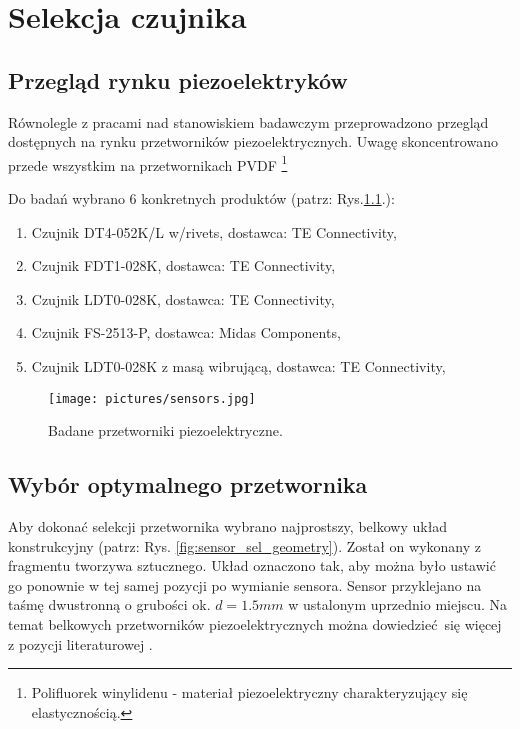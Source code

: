 \chapter{Selekcja czujnika}
\label{sec:sensor_selection}

\section{Przegląd rynku piezoelektryków}
\label{sec:piezoelectric_research}

Równolegle z pracami nad stanowiskiem badawczym przeprowadzono przegląd dostępnych
na rynku przetworników piezoelektrycznych. Uwagę skoncentrowano przede wszystkim 
na przetwornikach PVDF
\footnote{Polifluorek winylidenu - 
materiał piezoelektryczny charakteryzujący się elastycznością.}

Do badań wybrano 6 konkretnych produktów (patrz: Rys.\ref{fig:sensors}.):

\begin{enumerate}
\item [1.1] Czujnik DT4-052K/L w/rivets, dostawca: TE Connectivity,
\item [2] Czujnik FDT1-028K, dostawca: TE Connectivity,
\item [4] Czujnik LDT0-028K, dostawca: TE Connectivity,
\item [5] Czujnik FS-2513-P, dostawca: Midas Components,
\item [6] Czujnik LDT0-028K z masą wibrującą, dostawca: TE Connectivity,
\end{enumerate}


\begin{figure}[tbhp]
\centering
\texttt{[image: pictures/sensors.jpg]}
\caption{Badane przetworniki piezoelektryczne.}
\label{fig:sensors}
\end{figure}

\pagebreak

\section{Wybór optymalnego przetwornika}
\label{sec:optimal_piezoelectric_selection}

Aby dokonać selekcji przetwornika wybrano najprostszy, belkowy układ konstrukcyjny 
(patrz: Rys. \ref{fig:sensor_sel_geometry}). Został on wykonany z fragmentu 
tworzywa sztucznego. Układ oznaczono tak, aby można było ustawić go ponownie 
w tej samej pozycji po wymianie sensora. Sensor przyklejano na taśmę dwustronną 
o grubości ok. $ d = 1.5 mm$ w ustalonym uprzednio miejscu. Na temat
belkowych przetworników piezoelektrycznych można dowiedzieć się więcej 
z pozycji literaturowej \cite{belkowy_sensor}. 

